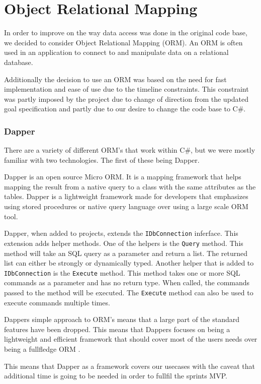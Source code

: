 \section{Object Relational Mapping}
In order to improve on the way data access was done in the original code base, we decided to consider Object Relational Mapping (ORM). An ORM is often used in an application to connect to and manipulate data on a relational database. %

Additionally the decision to use an ORM was based on the need for fast implementation and ease of use due to the timeline constraints. This constraint was partly imposed by the \knox{} project due to change of direction from the updated goal specification and partly due to our desire to change the code base to C\#. 

\subsubsection{Dapper}
There are a variety of different ORM's that work within C\#, but we were mostly familiar with two technologies. The first of these being Dapper.
 
Dapper is an open source Micro ORM. It is a mapping framework that helps mapping the result from a native query to a class with the same attributes as the tables. Dapper is a lightweight framework made for developers that emphasizes using stored procedures or native query language over using a large scale ORM tool. 


Dapper, when added to projects, extends the \texttt{IDbConnection} inferface. This extension adds helper methods. 
One of the helpers is the \texttt{Query} method. This method will take an SQL query as a parameter and return a list. The returned list can either be strongly or dynamically typed.
Another helper that is added to \texttt{IDbConnection} is the \texttt{Execute} method. This method takes one or more SQL commands as a parameter and has no return type. When called, the commands passed to the method will be executed. The \texttt{Execute} method can also be used to execute commands multiple times\cite{Dapper_Git}.

Dappers simple approach to ORM's means that a large part of the standard features have been dropped. This means that Dappers focuses on being a lightweight and efficient framework that should cover most of the users needs over being a fullfledge ORM \cite{Dapper_Git}.

This means that Dapper as a framework covers our usecases with the caveat that additional time is going to be needed in order to fullfil the sprints MVP. 

